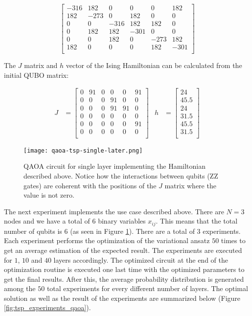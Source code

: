 \documentclass[12pt,a4paper]{report}
\begin{document}
\[
\begin{bmatrix}
-316 & 182 & 0 & 0 & 0 & 182 \\
182 & -273 & 0 & 182 & 0 & 0 \\
0 & 0 & -316 & 182 & 182 & 0 \\
0 & 182 & 182 & -301 & 0 & 0 \\
0 & 0 & 182 & 0 & -273 & 182 \\
182 & 0 & 0 & 0 & 182 & -301 \\
\end{bmatrix}
\]

\noindent
The \( J \) matrix and \( h \) vector of the Ising Hamiltonian can be calculated from the initial QUBO matrix:

\[
\begin{aligned}
J &= \begin{bmatrix}
0 & 91 & 0 & 0 & 0 & 91 \\
0 & 0 & 0 & 91 & 0 & 0 \\
0 & 0 & 0 & 91 & 91 & 0 \\
0 & 0 & 0 & 0 & 0 & 0 \\
0 & 0 & 0 & 0 & 0 & 91 \\
0 & 0 & 0 & 0 & 0 & 0 \\
\end{bmatrix}
&
h &= \begin{bmatrix}
24 \\ 
45.5 \\ 
24 \\ 
31.5 \\ 
45.5 \\ 
31.5 \\
\end{bmatrix}
\end{aligned}
\]

\begin{figure}[!h]
    \centering
    \texttt{[image: qaoa-tsp-single-later.png]}
    \caption{QAOA circuit for single layer implementing the Hamiltonian described above. Notice how the interactions between qubits (ZZ gates) are coherent with the positions of the \(J\) matrix where the value is not zero.}
    \label{fig:qaoa_tsp_single_circuit}
\end{figure}

\newpage
\noindent
The next experiment implements the use case described above. There are \(N = 3\) nodes and we have a total of \(6\) binary variables \(x_{ij}\). This means that the total number of qubits is \(6\) (as seen in Figure \ref{fig:qaoa_tsp_single_circuit}). There are a total of \(3\) experiments. Each experiment performs the optimization of the variational ansatz \(50\) times to get an average estimation of the expected result. The experiments are executed for \(1\), \(10\) and \(40\) layers accordingly. The optimized circuit at the end of the optimization routine is executed one last time with the optimized parameters to get the final results. After this, the average probability distribution is generated among the \(50\) total experiments for every different number of layers. The optimal solution as well as the result of the experiments are summarized below (Figure \ref{fig:tsp_experiments_qaoa}).
\end{document}
